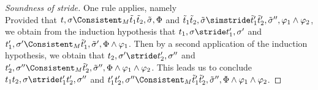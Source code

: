 \begin{proof}[Soundness of stride]
{One rule applies, namely \\
Provided that $t,\sigma\Consistent_M\tilde{t}_1\And \tilde{t}_2,\tilde{\sigma},\Phi$
and $\tilde{t}_1\And \tilde{t}_2,\tilde{\sigma}\simstride\tilde{t}'_1\And\tilde{t}'_2,\tilde{\sigma}'',\phi_1\land\phi_2$,
we obtain from the induction hypothesis that $t_1,\sigma\stride t_1',\sigma'$ and $t_1',\sigma'\Consistent_M\tilde{t}_1',\tilde{\sigma}',\Phi\land\phi_1$.
Then by a second application of the induction hypothesis, we obtain that $t_2,\sigma'\stride t_2',\sigma''$ and $t_2',\sigma''\Consistent_M\tilde{t}_2',\tilde{\sigma}'',\Phi\land\phi_1\land\phi_2$.
This leads us to conclude $t_1\And t_2,\sigma\stride t_1'\And t_2',\sigma''$ and $t_1'\And t_2',\sigma''\Consistent_M\tilde{t}_1'\And\tilde{t}_2',\tilde{\sigma}'',\Phi\land\phi_1\land\phi_2$.

}

\end{proof}

